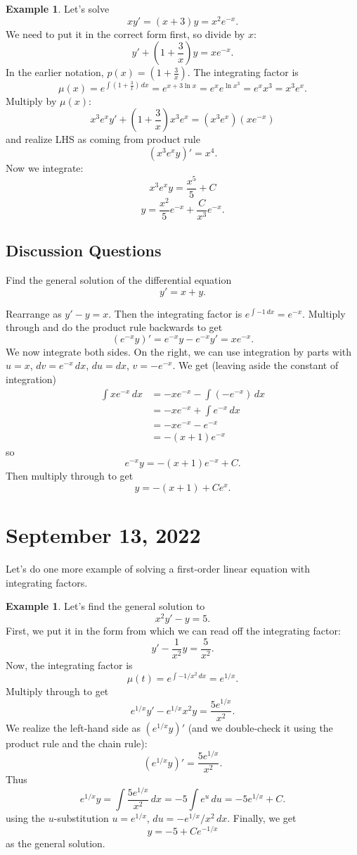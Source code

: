 \documentclass[12pt]{amsart}
\numberwithin{equation}{section}
\theoremstyle{plain} %
\newcommand{\Sept}[1]{\section{September #1, 2022}}
\theoremstyle{definition}
\newtheorem{ex}[equation]{Example}
\theoremstyle{remark}
\begin{document}
\begin{ex}
Let's solve
\[ x y' = (x+3) y = x^2 e^{-x}.\]
We need to put it in the correct form first, so divide by $x$:
\[ y' + (1+\frac{3}{x}) y = x e^{-x}.\]
In the earlier notation, $p(x) = (1+\frac{3}{x})$. The integrating factor is
\[ \mu(x)=e^{\int (1+\frac{3}{x}) \, dx} = e^{ x + 3 \ln x} = e^x  e^{\ln x^3} = e^x  x^3 = x^3 e^x.\]
Multiply by $\mu(x)$:
\[ x^3 e^x y' + (1+\frac{3}{x}) x^3 e^x = (x^3 e^x) (x e^{-x})\]
and realize LHS as coming from product rule
\[ (x^3 e^x y)' = x^4.\]
Now we integrate:
\[ x^3 e^x  y = \frac{x^5}{5} + C\]
\[ y = \frac{x^2}{5} e^{-x} + \frac{C}{x^3} e^{-x}.\]
\end{ex}

\subsection*{Discussion Questions} Find the general solution of the differential equation
\[ y' = x+ y.\]


\begin{framed}
Rearrange as $y' - y = x$. Then the integrating factor is $e^{\int -1 \, dx} = e^{-x}$. Multiply through and do the product rule backwards to get
\[ (e^{-x} y)' =e^{-x} y - e^{-x} y' = x e^{-x}.\]
We now integrate both sides. On the right, we can use integration by parts with $u=x$, $dv= e^{-x} \, dx$, $du= dx$, $v= -e^{-x}$. We get (leaving aside the constant of integration)
\begin{align*} \int x e^{-x} \, dx& = - x e^{-x} - \int (-e^{-x}) \, dx \\&= -xe^{-x} + \int e^{-x} \, dx \\&= -xe^{-x}  - e^{-x} \\&= -(x+1) e^{-x}\end{align*}
so \[ e^{-x} y = - (x+1) e^{-x} + C.\]
Then multiply through to get
\[ y = -(x+1) + C e^x.\]
\end{framed}


\Sept{13}

Let's do one more example of solving a first-order linear equation with integrating factors.

\begin{ex} Let's find the general solution to
\[ x^2 y' - y = 5.\]
First, we put it in the form from which we can read off the integrating factor:
\[ y' - \frac{1}{x^2} y = \frac{5}{x^2}.\]
Now, the integrating factor is
\[ \mu(t) = e^{\int -1/x^2 \, dx} = e^{1/x}.\]
Multiply through to get
\[ e^{1/x} y' - e^{1/x}{x^2} y = \frac{ 5 e^{1/x}}{x^2}.\]
We realize the left-hand side as $(e^{1/x} y)'$ (and we double-check it using the product rule and the chain rule):
\[ (e^{1/x} y)' = \frac{ 5 e^{1/x}}{x^2}.\]
Thus
\[ e^{1/x} y = \int \frac{ 5 e^{1/x}}{x^2} \, dx = -5 \int e^{u} \, du = -5 e^{1/x} + C.\]
using the $u$-substitution $u=e^{1/x}$, $du= -e^{1/x}/x^2 \, dx$.
Finally, we get
\[ y = -5 + C e^{-1/x}\]
as the general solution.
\end{ex}
\end{document}
